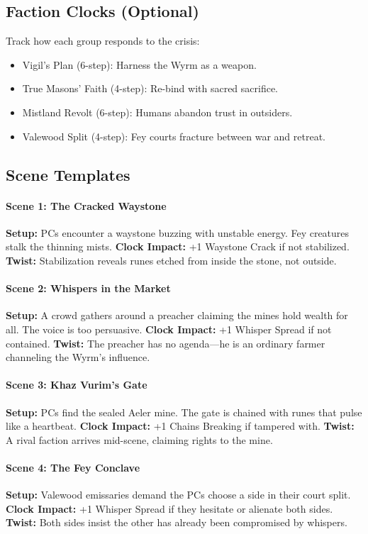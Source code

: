 \documentclass[12pt]{book}
\begin{document}
\subsection*{Faction Clocks (Optional)}
Track how each group responds to the crisis:
\begin{itemize}
  \item Vigil’s Plan (6-step): Harness the Wyrm as a weapon.
  \item True Masons’ Faith (4-step): Re-bind with sacred sacrifice.
  \item Mistland Revolt (6-step): Humans abandon trust in outsiders.
  \item Valewood Split (4-step): Fey courts fracture between war and retreat.
\end{itemize}

\subsection*{Scene Templates}

\paragraph{Scene 1: The Cracked Waystone}
\textbf{Setup:} PCs encounter a waystone buzzing with unstable energy. Fey creatures stalk the thinning mists.
\textbf{Clock Impact:} +1 Waystone Crack if not stabilized.
\textbf{Twist:} Stabilization reveals runes etched from inside the stone, not outside.

\paragraph{Scene 2: Whispers in the Market}
\textbf{Setup:} A crowd gathers around a preacher claiming the mines hold wealth for all. The voice is too persuasive.
\textbf{Clock Impact:} +1 Whisper Spread if not contained.
\textbf{Twist:} The preacher has no agenda—he is an ordinary farmer channeling the Wyrm’s influence.

\paragraph{Scene 3: Khaz Vurim’s Gate}
\textbf{Setup:} PCs find the sealed Aeler mine. The gate is chained with runes that pulse like a heartbeat.
\textbf{Clock Impact:} +1 Chains Breaking if tampered with.
\textbf{Twist:} A rival faction arrives mid-scene, claiming rights to the mine.

\paragraph{Scene 4: The Fey Conclave}
\textbf{Setup:} Valewood emissaries demand the PCs choose a side in their court split.
\textbf{Clock Impact:} +1 Whisper Spread if they hesitate or alienate both sides.
\textbf{Twist:} Both sides insist the other has already been compromised by whispers.
\end{document}
